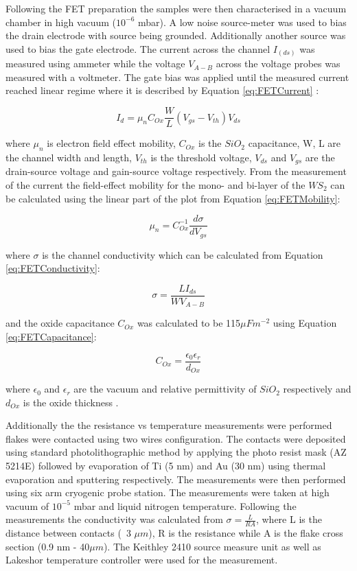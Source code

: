 Following the FET preparation the samples were then characterised in a vacuum chamber in high vacuum ($10^{-6}$ mbar). A low noise source-meter was used to bias the drain electrode with source being grounded. Additionally another source was used to bias the gate electrode. The current across the channel $I_(ds)$ was measured using ammeter while the voltage $V_{A-B}$ across the voltage probes was measured with a voltmeter. The gate bias was applied until the measured current reached linear regime where it is described by Equation \ref{eq:FETCurrent} \cite{Sze2006}: 

\begin{equation}
I_d = {\mu}_nC_{Ox}\frac{W}{L}(V_{gs} - V_{th})V_{ds}
\label{eq:FETCurrent}
\end{equation}

where ${\mu}_n$ is electron field effect mobility, $C_{Ox}$ is the $SiO_2$ capacitance, W, L are the channel width and length, $V_{th}$ is the threshold voltage, $V_{ds}$ and $V_{gs}$ are the drain-source voltage and gain-source voltage respectively. From the measurement of the current the field-effect mobility for the mono- and bi-layer of the $WS_2$ can be calculated using the linear part of the plot from Equation \ref{eq:FETMobility}: 

\begin{equation}
\mu_{n} = C_{Ox}^{-1}\frac{d{\sigma}}{dV_{gs}}
\label{eq:FETMobility}
\end{equation}

where $\sigma$ is the channel conductivity which can be calculated from Equation \ref{eq:FETConductivity}:

\begin{equation}
\sigma = \frac{LI_{ds}}{W V_{A-B}}
\label{eq:FETConductivity}
\end{equation}

and the oxide capacitance $C_{Ox}$ was calculated to be 115$\mu F m^{-2}$ using Equation \ref{eq:FETCapacitance}:

\begin{equation}
C_{Ox} = \frac{{\epsilon}_0{\epsilon}_r}{d_{Ox}}
\label{eq:FETCapacitance}
\end{equation}

where ${\epsilon}_0$ and ${\epsilon}_r$ are the vacuum and relative permittivity of $SiO_2$ respectively and $d_{Ox}$ is the oxide thickness \cite{Sze2006}.

Additionally the the resistance vs temperature measurements were performed flakes were contacted using two wires configuration. The contacts were deposited using standard photolithographic method by applying the photo resist mask (AZ 5214E) followed by evaporation of Ti (5 nm) and Au (30 nm) using thermal evaporation and sputtering respectively. The measurements were then performed using six arm cryogenic probe station. The measurements were taken at high vacuum of $10^{-5}$ mbar and liquid nitrogen temperature. Following the measurements the conductivity was calculated from $\sigma = \frac{L}{RA}$, where L is the distance between contacts (~3 $\mu m$), R is the resistance while A is the flake cross section (0.9 nm - 40$\mu m$). The Keithley 2410 source measure unit as well as Lakeshor temperature controller were used for the measurement.